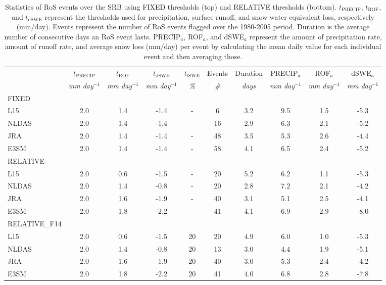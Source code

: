 \documentclass{article}
\begin{document}
{\begin{table}[H]
\caption{Statistics of RoS events over the SRB using FIXED thresholds (top) and RELATIVE thresholds (bottom). $t_{\textrm{PRECIP}}$, $t_{\textrm{ROF}}$, and $t_{\textrm{dSWE}}$ represent the thresholds used for precipitation, surface runoff, and snow water equivalent loss, respectively (mm/day). Events represent the number of RoS events flagged over the 1980-2005 period. Duration is the average number of consecutive days an RoS event lasts. PRECIP$_{a}$, ROF$_{a}$, and dSWE$_{a}$ represent the amount of precipitation rate, amount of runoff rate, and average snow loss (mm/day) per event by calculating the mean daily value for each individual event and then averaging those.}
\scriptsize
\begin{tabular}{lccccccccc}
      &  $t_{\textrm{PRECIP}}$ & $t_{\textrm{ROF}}$ & $t_{\textrm{dSWE}}$ & $t_{\textrm{fSWE}}$ & Events & Duration & PRECIP$_{a}$ & ROF$_{a}$ & dSWE$_{a}$ \\
      &  \textit{mm day$^{-1}$} & \textit{mm day$^{-1}$} & \textit{mm day$^{-1}$} & \textit{\%} & \textit{\#} & \textit{days} & \textit{mm day$^{-1}$} & \textit{mm day$^{-1}$} & \textit{mm day$^{-1}$} \\ \hline
FIXED &         &         &         &        &     &              &              &                &                \\ \hline
L15 & 2.0 & 1.4 & -1.4 & - & 6 & 3.2 & 9.5 & 1.5 & -5.3 \\
NLDAS & 2.0 & 1.4 & -1.4 & - & 16 & 2.9 & 6.3 & 2.1 & -5.2 \\
JRA & 2.0 & 1.4 & -1.4 & - & 48 & 3.5 & 5.3 & 2.6 & -4.4 \\
E3SM & 2.0 & 1.4 & -1.4 & - & 58 & 4.1 & 6.5 & 2.4 & -5.2 \\ \hline
RELATIVE      &         &         &         &        &     &              &              &                &                \\ \hline
L15 & 2.0 & 0.6 & -1.5 & - & 20 & 5.2 & 6.2 & 1.1 & -5.3 \\
NLDAS & 2.0 & 1.4 & -0.8 & - & 20 & 2.8 & 7.2 & 2.1 & -4.2 \\
JRA & 2.0 & 1.6 & -1.9 & - & 40 & 3.1 & 5.1 & 2.5 & -4.1 \\
E3SM & 2.0 & 1.8 & -2.2 & - & 41 & 4.1 & 6.9 & 2.9 & -8.0 \\ \hline
RELATIVE\_F14      &         &         &         &        &     &              &              &                &                \\ \hline
L15 & 2.0 & 0.6 & -1.5 & 20 & 20 & 4.9 & 6.0 & 1.0 & -5.3 \\
NLDAS & 2.0 & 1.4 & -0.8 & 20 & 13 & 3.0 & 4.4 & 1.9 & -5.1 \\
JRA & 2.0 & 1.6 & -1.9 & 20 & 40 & 3.0 & 5.3 & 2.4 & -4.2 \\
E3SM & 2.0 & 1.8 & -2.2 & 20 & 41 & 4.0 & 6.8 & 2.8 & -7.8 \\   \hline
\end{tabular}
\label{table:means}
\end{table}

}
\end{document}
